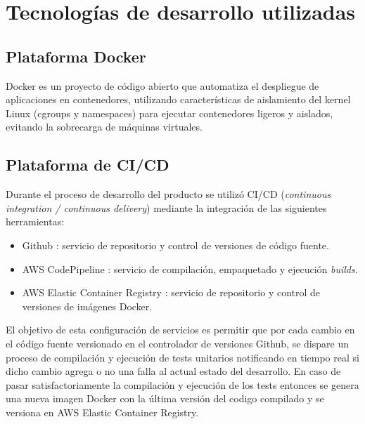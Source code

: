 \section{Tecnologías de desarrollo utilizadas}




\subsection{Plataforma Docker}

Docker \cite{docker_website} es un proyecto de código abierto que automatiza el despliegue de aplicaciones en contenedores, utilizando características de aislamiento del kernel Linux (cgroups y namespaces) para ejecutar contenedores ligeros y aislados, evitando la sobrecarga de máquinas virtuales.





\subsection{Plataforma de CI/CD}
Durante el proceso de desarrollo del producto se utilizó CI/CD (\textit{continuous integration / continuous delivery}) mediante la integración de las siguientes herramientas:

\begin{itemize}
	\item Github \cite{SoftwareTool_Github}: servicio de repositorio y control de versiones de código fuente.
	\item AWS CodePipeline \cite{SoftwareTool_codePipeline}: servicio de compilación, empaquetado y ejecución \textit{builds}.
	\item AWS Elastic Container Registry \cite{SoftwareTool_ECR}: servicio de repositorio y control de versiones de imágenes Docker.
\end{itemize}

El objetivo de esta configuración de servicios es permitir que por cada cambio en el código fuente versionado en el controlador de versiones Github, se dispare un proceso de compilación y ejecución de tests unitarios notificando en tiempo real si dicho cambio agrega o no una falla al actual estado del desarrollo. En caso de pasar satisfactoriamente la compilación y ejecución de los tests entonces se genera una nueva imagen Docker con la última versión del codigo compilado y se versiona en AWS Elastic Container Registry.

